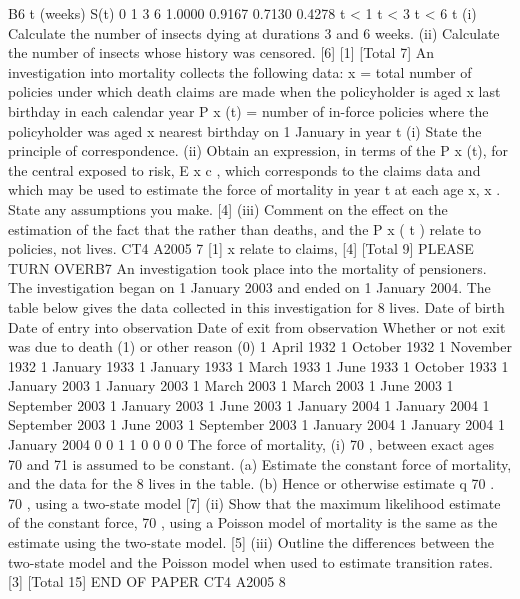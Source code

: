 \documentclass[a4paper,12pt]{article}
\begin{document}
\begin{enumerate}
B6
t (weeks) S(t)
0
1
3
6 1.0000
0.9167
0.7130
0.4278
t < 1
t < 3
t < 6
t
(i) Calculate the number of insects dying at durations 3 and 6 weeks.
(ii) Calculate the number of insects whose history was censored.
[6]
[1]
[Total 7]
An investigation into mortality collects the following data:
x
= total number of policies under which death claims are made when the
policyholder is aged x last birthday in each calendar year
P x (t) = number of in-force policies where the policyholder was aged x nearest
birthday on 1 January in year t
(i) State the principle of correspondence.
(ii) Obtain an expression, in terms of the P x (t), for the central exposed to risk, E x c ,
which corresponds to the claims data and which may be used to estimate the
force of mortality in year t at each age x, x . State any assumptions you
make.
[4]
(iii) Comment on the effect on the estimation of the fact that the
rather than deaths, and the P x ( t ) relate to policies, not lives.
CT4 A2005
7
[1]
x
relate to claims,
[4]
[Total 9]
PLEASE TURN OVERB7
An investigation took place into the mortality of pensioners. The investigation began
on 1 January 2003 and ended on 1 January 2004. The table below gives the data
collected in this investigation for 8 lives.
Date of birth Date of entry
into observation Date of exit from
observation Whether
or not exit was
due to death (1)
or other
reason (0)
1 April 1932
1 October 1932
1 November 1932
1 January 1933
1 January 1933
1 March 1933
1 June 1933
1 October 1933 1 January 2003
1 January 2003
1 March 2003
1 March 2003
1 June 2003
1 September 2003
1 January 2003
1 June 2003 1 January 2004
1 January 2004
1 September 2003
1 June 2003
1 September 2003
1 January 2004
1 January 2004
1 January 2004 0
0
1
1
0
0
0
0
The force of mortality,
(i)
70 ,
between exact ages 70 and 71 is assumed to be constant.
(a) Estimate the constant force of mortality,
and the data for the 8 lives in the table.
(b) Hence or otherwise estimate q 70 .
70 ,
using a two-state model
[7]
(ii) Show that the maximum likelihood estimate of the constant force, 70 , using a
Poisson model of mortality is the same as the estimate using the two-state
model.
[5]
(iii) Outline the differences between the two-state model and the Poisson model
when used to estimate transition rates.
[3]
[Total 15]
END OF PAPER
CT4 A2005
8


\end{enumerate}
\end{document}
